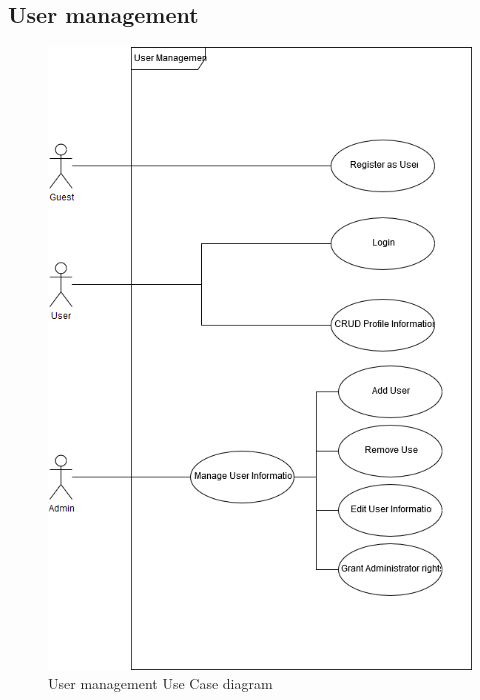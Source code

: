\documentclass{article}
\begin{document}
   	\subsection{User management} 
   	\begin{figure}[h!]
        \includegraphics[width=0.8\linewidth]{Images/Users.png}
        \caption{User management Use Case diagram}
    \end{figure}
   	\newpage
\end{document}
